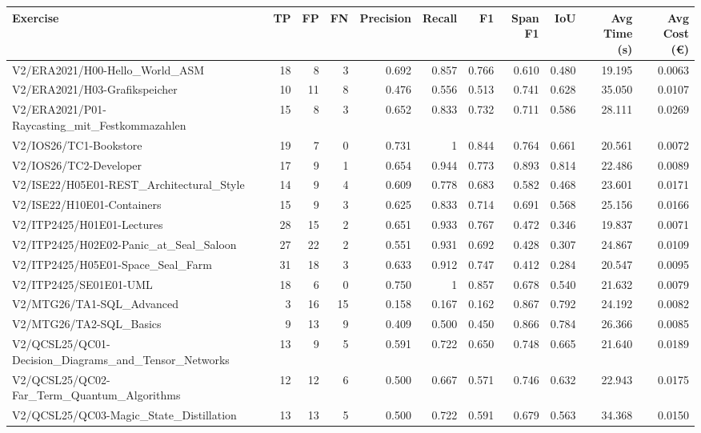 \begin{tabular}{lrrrrrrrrrr}
Exercise & TP & FP & FN & Precision & Recall & F1 & Span F1 & IoU & Avg Time (s) & Avg Cost (€) \\
\hline
V2/ERA2021/H00-Hello\_World\_ASM & 18 & 8 & 3 & 0.692 & 0.857 & 0.766 & 0.610 & 0.480 & 19.195 & 0.0063 \\
V2/ERA2021/H03-Grafikspeicher & 10 & 11 & 8 & 0.476 & 0.556 & 0.513 & 0.741 & 0.628 & 35.050 & 0.0107 \\
V2/ERA2021/P01-Raycasting\_mit\_Festkommazahlen & 15 & 8 & 3 & 0.652 & 0.833 & 0.732 & 0.711 & 0.586 & 28.111 & 0.0269 \\
V2/IOS26/TC1-Bookstore & 19 & 7 & 0 & 0.731 & 1 & 0.844 & 0.764 & 0.661 & 20.561 & 0.0072 \\
V2/IOS26/TC2-Developer & 17 & 9 & 1 & 0.654 & 0.944 & 0.773 & 0.893 & 0.814 & 22.486 & 0.0089 \\
V2/ISE22/H05E01-REST\_Architectural\_Style & 14 & 9 & 4 & 0.609 & 0.778 & 0.683 & 0.582 & 0.468 & 23.601 & 0.0171 \\
V2/ISE22/H10E01-Containers & 15 & 9 & 3 & 0.625 & 0.833 & 0.714 & 0.691 & 0.568 & 25.156 & 0.0166 \\
V2/ITP2425/H01E01-Lectures & 28 & 15 & 2 & 0.651 & 0.933 & 0.767 & 0.472 & 0.346 & 19.837 & 0.0071 \\
V2/ITP2425/H02E02-Panic\_at\_Seal\_Saloon & 27 & 22 & 2 & 0.551 & 0.931 & 0.692 & 0.428 & 0.307 & 24.867 & 0.0109 \\
V2/ITP2425/H05E01-Space\_Seal\_Farm & 31 & 18 & 3 & 0.633 & 0.912 & 0.747 & 0.412 & 0.284 & 20.547 & 0.0095 \\
V2/ITP2425/SE01E01-UML & 18 & 6 & 0 & 0.750 & 1 & 0.857 & 0.678 & 0.540 & 21.632 & 0.0079 \\
V2/MTG26/TA1-SQL\_Advanced & 3 & 16 & 15 & 0.158 & 0.167 & 0.162 & 0.867 & 0.792 & 24.192 & 0.0082 \\
V2/MTG26/TA2-SQL\_Basics & 9 & 13 & 9 & 0.409 & 0.500 & 0.450 & 0.866 & 0.784 & 26.366 & 0.0085 \\
V2/QCSL25/QC01-Decision\_Diagrams\_and\_Tensor\_Networks & 13 & 9 & 5 & 0.591 & 0.722 & 0.650 & 0.748 & 0.665 & 21.640 & 0.0189 \\
V2/QCSL25/QC02-Far\_Term\_Quantum\_Algorithms & 12 & 12 & 6 & 0.500 & 0.667 & 0.571 & 0.746 & 0.632 & 22.943 & 0.0175 \\
V2/QCSL25/QC03-Magic\_State\_Distillation & 13 & 13 & 5 & 0.500 & 0.722 & 0.591 & 0.679 & 0.563 & 34.368 & 0.0150 \\
\end{tabular}
